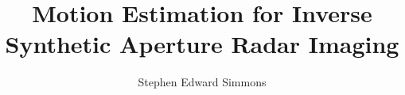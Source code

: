 \documentclass[12pt]{book}
\begin{document}

\title{Motion Estimation for Inverse Synthetic Aperture Radar Imaging}
\author[S. E. Simmons]{Stephen Edward Simmons}

\acidfree

\titlepage
\copyrightnotice
\startpreface
	
\singlespaced
\tableofcontents
\listoffigures
\doublespaced
\endpreface

	
        
	
      	
	
	
	
	
	
	
	

\singlespaced


\end{document}
